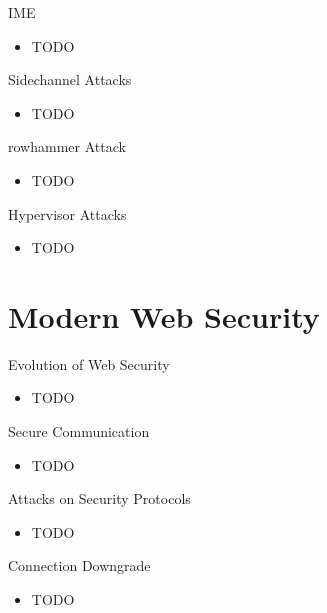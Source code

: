 \documentclass{curs}
\begin{document}
\begin{frame}{IME}
  \begin{itemize}
    \item TODO
  \end{itemize}
\end{frame}

\begin{frame}{Sidechannel Attacks}
  \begin{itemize}
    \item TODO
  \end{itemize}
\end{frame}

\begin{frame}{rowhammer Attack}
  \begin{itemize}
    \item TODO
  \end{itemize}
\end{frame}

\begin{frame}{Hypervisor Attacks}
  \begin{itemize}
    \item TODO
  \end{itemize}
\end{frame}

\section{Modern Web Security}

\begin{frame}{Evolution of Web Security}
  \begin{itemize}
    \item TODO
  \end{itemize}
\end{frame}

\begin{frame}{Secure Communication}
  \begin{itemize}
    \item TODO
  \end{itemize}
\end{frame}

\begin{frame}{Attacks on Security Protocols}
  \begin{itemize}
    \item TODO
  \end{itemize}
\end{frame}

\begin{frame}{Connection Downgrade}
  \begin{itemize}
    \item TODO
  \end{itemize}
\end{frame}
\end{document}
